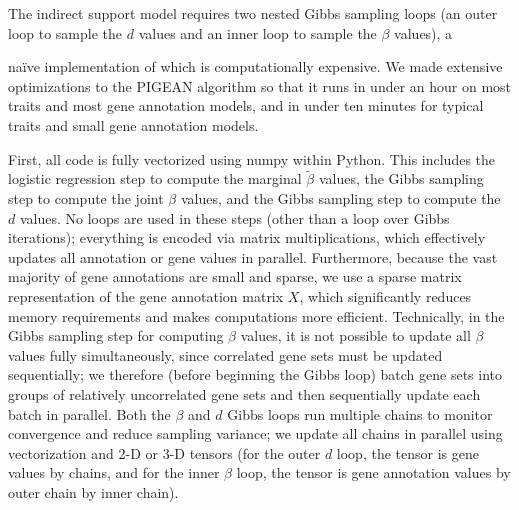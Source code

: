 The indirect support model requires two nested Gibbs sampling loops
(an outer loop to sample the $d$ values and an inner loop to sample
the $\beta$ values), a {na\"ive implementation of which is
computationally expensive. We made extensive optimizations to the
PIGEAN algorithm so that it runs in under an hour on most traits and
most gene annotation models, and in under ten minutes for typical
traits and small gene annotation models. 

First, all code is fully vectorized using numpy within Python. This
includes the logistic regression step to compute the marginal
$\tilde{\beta}$ values, the Gibbs sampling step to compute the joint
$\beta$ values, and the Gibbs sampling step to compute the $d$
values. No loops are used in these steps (other than a loop over Gibbs
iterations); everything is encoded via matrix multiplications, which
effectively updates all annotation or gene values in
parallel. Furthermore, because the vast majority of gene annotations
are small and sparse, we use a sparse matrix representation of the
gene annotation matrix $X$, which significantly reduces memory
requirements and makes computations more efficient. Technically, in
the Gibbs sampling step for computing $\beta$ values, it is not
possible to update all $\beta$ values fully simultaneously, since
correlated gene sets must be updated sequentially; we therefore
(before beginning the Gibbs loop) batch gene sets into groups of
relatively uncorrelated gene sets and then sequentially update each
batch in parallel. Both the $\beta$ and $d$ Gibbs loops run multiple
chains to monitor convergence and reduce sampling variance; we
update all chains in parallel using vectorization and 2-D or 3-D
tensors (for the outer $d$ loop, the tensor is gene values by
chains, and for the inner $\beta$ loop, the tensor is gene annotation
values by outer chain by inner chain). 

}
